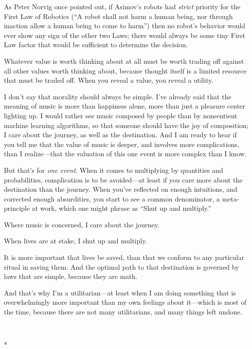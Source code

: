 {
 As Peter Norvig once pointed out, if Asimov's
robots had \textit{strict} priority for the First Law of Robotics
(``A robot shall not harm a human being, nor through
inaction allow a human being to come to harm'') then
no robot's behavior would ever show any sign of the
other two Laws; there would always be some tiny First Law factor that
would be sufficient to determine the decision.}

{
 Whatever value is worth thinking about at all must be worth
trading off against all other values worth thinking about, because
thought itself is a limited resource that must be traded off. When you
reveal a value, you reveal a utility.}

{
 I don't say that morality should always be simple.
I've already said that the meaning of music is more
than happiness alone, more than just a pleasure center lighting up. I
would rather see music composed by people than by nonsentient machine
learning algorithms, so that someone should have the joy of
composition; I care about the journey, as well as the destination. And
I am ready to hear if you tell me that the value of music is deeper,
and involves more complications, than I realize---that the valuation of
this one event is more complex than I know.}

{
 But that's for \textit{one event}. When it comes
to multiplying by quantities and probabilities, complication is to be
avoided---at least if you care more about the destination than the
journey. When you've reflected on enough intuitions,
and corrected enough absurdities, you start to see a common
denominator, a meta-principle at work, which one might phrase as
``Shut up and multiply.''}

{
 Where music is concerned, I care about the journey.}

{
 When lives are at stake, I shut up and multiply.}

{
 It is more important that lives be saved, than that we conform to
any particular ritual in saving them. And the optimal path to that
destination is governed by laws that are simple, because they are
math.}

{
 And that's why I'm a
utilitarian---at least when I am doing something that is overwhelmingly
more important than my own feelings about it---which is most of the
time, because there are not many utilitarians, and many things left
undone.}

{\centering
 \ ~
\par}

{\centering
 *
\par}


